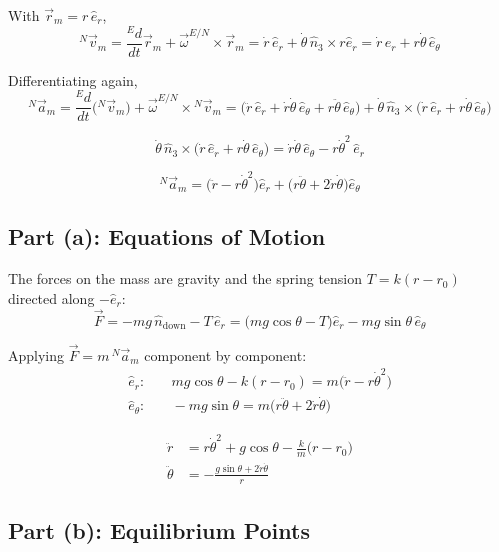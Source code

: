 \documentclass[11pt]{article}
\begin{document}
With $\vec r_m = r\,\hat e_r$,
\[
    {}^{N}\vec v_m = \frac{{}^{E}d}{dt}\vec r_m + \vec\omega^{E/N}\times\vec r_m
    = \dot r\,\hat e_r + \dot\theta\,\hat n_3\times r\hat e_r
    = \dot r\,\hat e_r + r\dot\theta\,\hat e_\theta
\]

Differentiating again,
\[
    {}^{N}\vec a_m = \frac{{}^{E}d}{dt}\big({}^{N}\vec v_m\big) + \vec\omega^{E/N}\times{}^{N}\vec v_m
    = \big(\ddot r\,\hat e_r + \dot r\dot\theta\,\hat e_\theta + r\ddot\theta\,\hat e_\theta\big)
    + \dot\theta\,\hat n_3\times\big(\dot r\,\hat e_r + r\dot\theta\,\hat e_\theta\big)
\]

\[
    \dot\theta\,\hat n_3\times\big(\dot r\,\hat e_r + r\dot\theta\,\hat e_\theta\big) = \dot r\dot\theta\,\hat e_\theta - r\dot\theta^{2}\,\hat e_r
\]

\begin{result}
\[
    {}^{N}\vec a_m = \big(\ddot r - r\dot\theta^{2}\big)\hat e_r + \big(r\ddot\theta + 2\dot r\dot\theta\big)\hat e_\theta
\]
\end{result}

\subsection*{Part (a): Equations of Motion}

The forces on the mass are gravity and the spring tension $T = k(r-r_0)$ directed along $-\hat e_r$:
\[
    \vec F = -mg\,\hat n_{\text{down}} - T\,\hat e_r = \big(mg\cos\theta - T\big)\hat e_r - mg\sin\theta\,\hat e_\theta
\]

Applying $\vec F = m\,{}^{N}\vec a_m$ component by component:
\begin{align*}
    \hat e_r: &\quad mg\cos\theta - k(r-r_0) = m\big(\ddot r - r\dot\theta^{2}\big) \\
    \hat e_\theta: &\quad -mg\sin\theta = m\big(r\ddot\theta + 2\dot r\dot\theta\big)
\end{align*}

\begin{result}
\begin{align*}
    \ddot r &= r\dot\theta^{2} + g\cos\theta - \frac{k}{m}\big(r-r_0\big) \\[4pt]
    \ddot\theta &= -\frac{g\sin\theta + 2\dot r\dot\theta}{r}
\end{align*}
\end{result}

\subsection*{Part (b): Equilibrium Points}
\end{document}
